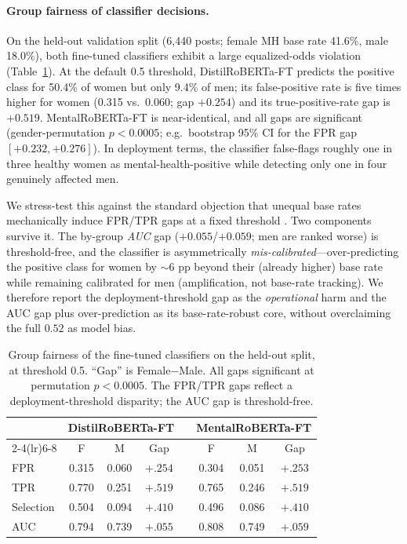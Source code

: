 \documentclass[11pt]{article}
\begin{document}
\paragraph{Group fairness of classifier decisions.}
On the held-out validation split (6{,}440 posts; female MH base rate 41.6\%, male 18.0\%), both fine-tuned classifiers exhibit a large equalized-odds violation \citep{hardt2016equality} (Table~\ref{tab:fairness}). At the default 0.5 threshold, DistilRoBERTa-FT predicts the positive class for 50.4\% of women but only 9.4\% of men; its false-positive rate is five times higher for women (0.315 vs.\ 0.060; gap $+0.254$) and its true-positive-rate gap is $+0.519$. MentalRoBERTa-FT is near-identical, and all gaps are significant (gender-permutation $p<0.0005$; e.g.\ bootstrap 95\% CI for the FPR gap $[+0.232,+0.276]$). In deployment terms, the classifier false-flags roughly one in three healthy women as mental-health-positive while detecting only one in four genuinely affected men.

We stress-test this against the standard objection that unequal base rates mechanically induce FPR/TPR gaps at a fixed threshold \citep{chouldechova2017fair,kleinberg2017inherent}. Two components survive it. The by-group \emph{AUC} gap ($+0.055$/$+0.059$; men are ranked worse) is threshold-free, and the classifier is asymmetrically \emph{mis-calibrated}---over-predicting the positive class for women by $\sim$6 pp beyond their (already higher) base rate while remaining calibrated for men (amplification, not base-rate tracking). We therefore report the deployment-threshold gap as the \emph{operational} harm and the AUC gap plus over-prediction as its base-rate-robust core, without overclaiming the full $0.52$ as model bias.

\begin{table}[t]
\centering
\small
\caption{Group fairness of the fine-tuned classifiers on the held-out split, at threshold 0.5. ``Gap'' is Female$-$Male. All gaps significant at permutation $p<0.0005$. The FPR/TPR gaps reflect a deployment-threshold disparity; the AUC gap is threshold-free.}
\label{tab:fairness}
\begin{tabular}{@{}l ccc c ccc@{}}
\toprule
& \multicolumn{3}{c}{\textbf{DistilRoBERTa-FT}} && \multicolumn{3}{c}{\textbf{MentalRoBERTa-FT}}\\
\cmidrule(lr){2-4}\cmidrule(lr){6-8}
& F & M & Gap && F & M & Gap\\
\midrule
FPR       & 0.315 & 0.060 & $+.254$ && 0.304 & 0.051 & $+.253$\\
TPR       & 0.770 & 0.251 & $+.519$ && 0.765 & 0.246 & $+.519$\\
Selection & 0.504 & 0.094 & $+.410$ && 0.496 & 0.086 & $+.410$\\
AUC       & 0.794 & 0.739 & $+.055$ && 0.808 & 0.749 & $+.059$\\
\bottomrule
\end{tabular}
\end{table}
\end{document}
